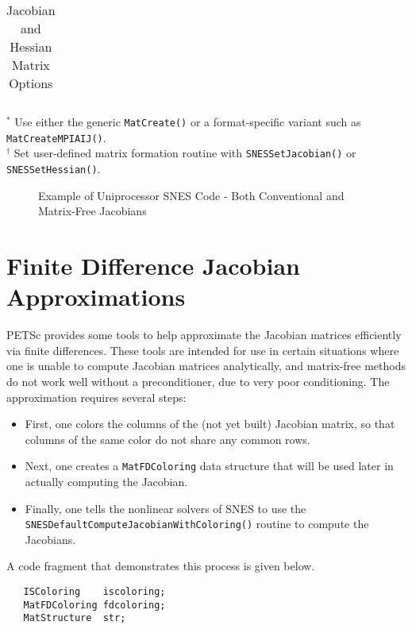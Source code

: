 {\begin{center}
\begin{table}[H]
\begin{tabular}{|c|l|l|}
& & \\ \hline
\end{tabular}

\medskip
$ ^* $ Use either the generic {\tt MatCreate()} or a format-specific variant
   such as {\tt MatCreateMPIAIJ()}.\\
$ ^\dagger $ Set user-defined matrix formation routine with {\tt SNESSetJacobian()} or
   {\tt SNESSetHessian()}.
\medskip
\caption{Jacobian and Hessian Matrix Options}
\label{table:jacobians}
\end{table}
\end{center}

\begin{figure}[H]
{\small
{}
}
\caption{Example of Uniprocessor SNES Code - Both Conventional and Matrix-Free Jacobians}
\label{fig:snesexample2}
\end{figure} 

\section{Finite Difference Jacobian Approximations}
\label{sec:fdmatrix}

PETSc provides some tools to help approximate the Jacobian matrices efficiently via 
finite differences.  These tools are intended for use in certain situations where
one is unable to compute Jacobian matrices analytically, and matrix-free methods
do not work well without a preconditioner, due to very poor conditioning.  
The approximation requires several steps:
\begin{itemize}
\item First, one colors the columns of the (not yet built) Jacobian matrix, so that 
      columns of the same color do not share any common rows.
\item Next, one creates a {\tt MatFDColoring} data structure that will be used later in 
      actually computing the Jacobian. 
\item Finally, one tells the nonlinear solvers of SNES to use the
      {\tt SNESDefaultComputeJacobianWithColoring()}
      routine to compute the Jacobians. 
\end{itemize}
A code fragment that demonstrates this process is given below.
\begin{verbatim}
   ISColoring    iscoloring;
   MatFDColoring fdcoloring;
   MatStructure  str;


\end{verbatim}}
